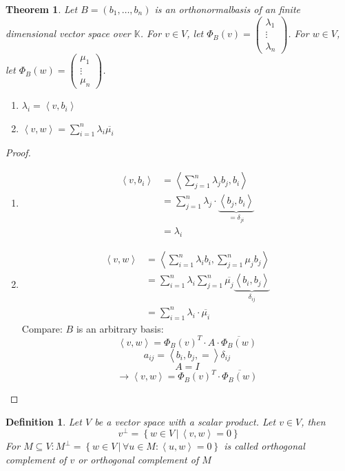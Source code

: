 \documentclass{article}
\newtheorem{theorem}{Theorem}  \numberwithin{theorem}{section}
\newtheorem{definition}{Definition}  \numberwithin{definition}{section}
\newcommand{\setdef}[2]{\left\{\left.#1\,\right|\,#2\right\}}
\newcommand{\ip}[2]{\left\langle#1,#2\right\rangle} %
\begin{document}
\begin{theorem} %
  Let $B = (b_1, \ldots, b_n)$ is an orthonormalbasis of an finite dimensional vector space over $\mathbb K$.
  For $v \in V$, let $\Phi_B(v) = \begin{pmatrix} \lambda_1 \\ \vdots \\ \lambda_n \end{pmatrix}$.
  For $w \in V$, let $\Phi_B(w) = \begin{pmatrix} \mu_1 \\ \vdots \\ \mu_n \end{pmatrix}$.
  \begin{enumerate}
    \item $\lambda_i = \ip{v}{b_i}$
    \item $\ip vw = \sum_{i=1}^n \lambda_i \overline{\mu_i}$
  \end{enumerate}
\end{theorem}

\begin{proof}
  \begin{enumerate}
    \item
      \begin{align*}
        \ip{v}{b_i} &= \ip{\sum_{j=1}^n \lambda_j b_j}{b_i} \\
                    &= \sum_{j=1}^n \lambda_j \cdot \underbrace{\ip{b_j}{b_i}}_{= \delta_{ji}} \\
                    &= \lambda_i
      \end{align*}
    \item
      \begin{align*}
        \ip vw &= \ip{\sum_{i=1}^n \lambda_i b_i}{\sum_{j=1}^n \mu_j b_j} \\
               &= \sum_{i=1}^n \lambda_i \sum_{j=1}^n \overline{\mu_j} \underbrace{\ip{b_i}{b_j}}_{\delta_{ij}} \\
               &= \sum_{i=1}^n \lambda_i \cdot \overline{\mu_i}
      \end{align*}
      Compare: $B$ is an arbitrary basis:
      \[ \ip vw = \Phi_B(v)^T \cdot A \cdot \overline{\Phi_B(w)} \]
      \[ a_{ij} = \ip{b_i, b_j} = \delta_{ij} \]
      \[ A = I \]
      \[ \to \ip vw = \Phi_B(v)^T \cdot \overline{\Phi_B(w)} \]
  \end{enumerate}
\end{proof}

\begin{definition}
  Let $V$ be a vector space with a scalar product.
  Let $v \in V$, then
  \[ v^\bot = \setdef{w \in V}{\ip vw = 0} \]
  For $M \subseteq V: M^\bot = \setdef{w \in V}{\forall u \in M: \ip uw = 0}$
  is called \emph{orthogonal complement of $v$} or \emph{orthogonal complement of $M$}
\end{definition}
\end{document}
